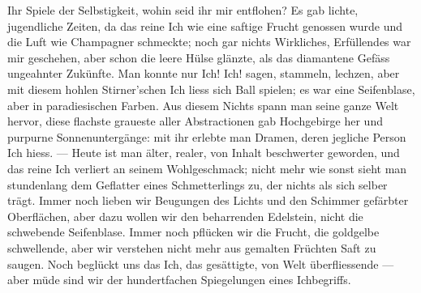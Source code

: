 Ihr Spiele der Selbstigkeit, wohin seid ihr mir entflohen? Es gab lichte, jugendliche Zeiten, da das reine Ich wie eine saftige Frucht genossen wurde und die Luft wie Champagner schmeckte; noch gar nichts Wirkliches, Erfüllendes war mir geschehen, aber schon die leere Hülse glänzte, als das diamantene Gefäss ungeahnter Zukünfte. Man konnte nur Ich! Ich! sagen, stammeln, lechzen, aber mit diesem hohlen Stirner’schen Ich liess sich Ball spielen; es war eine Seifenblase, aber in paradiesischen Farben. Aus diesem Nichts spann man seine ganze Welt hervor, diese flachste graueste aller Abstractionen gab Hochgebirge her und purpurne Sonnenuntergänge: mit ihr erlebte man Dramen, deren jegliche Person Ich hiess. — Heute ist man älter, realer, von Inhalt beschwerter geworden, und das reine Ich verliert an seinem Wohlgeschmack; nicht mehr wie sonst sieht man stundenlang dem Geflatter eines Schmetterlings zu, der nichts als sich selber trägt. Immer noch lieben wir Beugungen des Lichts und den Schimmer gefärbter Oberflächen, aber dazu wollen wir den beharrenden Edelstein, nicht die schwebende Seifenblase. Immer noch pflücken wir die Frucht, die goldgelbe schwellende, aber wir verstehen nicht mehr aus gemalten Früchten Saft zu saugen. Noch beglückt uns das Ich, das gesättigte, von Welt überfliessende — aber müde sind wir der hundertfachen Spiegelungen eines Ichbegriffs.
\par

